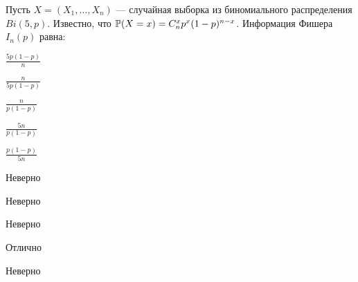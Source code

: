 
\begin{question}
Пусть \(X = (X_1, \ldots , X_n)\) — случайная выборка из биномиального
распределения \(Bi(5, p)\). Известно, что
\(\P(X = x) =C_n^x p^x(1-p)^{n-x}\). Информация Фишера \(I_n(p)\) равна:
\begin{answerlist}
  \item \(\frac{5p(1-p)}{n}\)
  \item \(\frac{n}{5p(1-p)}\)
  \item \(\frac{n}{p(1-p)}\)
  \item \(\frac{5n}{p(1-p)}\)
  \item \(\frac{p(1-p)}{5n}\)
\end{answerlist}
\end{question}

\begin{solution}
\begin{answerlist}
  \item Неверно
  \item Неверно
  \item Неверно
  \item Отлично
  \item Неверно
\end{answerlist}
\end{solution}

